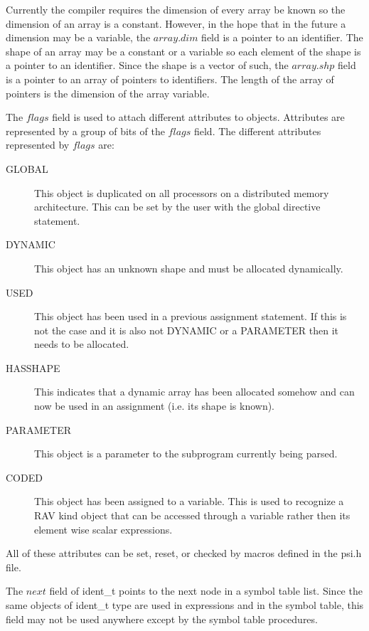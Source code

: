 Currently the compiler requires the dimension of every array be known
so the dimension of an array is a constant.  However, in the hope that in
the future a dimension may be a variable, the $array.dim$ field is a pointer
to an identifier.  The shape of an array may be a constant or a variable so
each element of the shape is a pointer to an identifier.  Since the shape
is a vector of such, the $array.shp$ field is a pointer to an array of pointers
to identifiers.  The length of the array of pointers is the dimension of the
array variable.

The $flags$ field is used to attach different attributes to objects.  
Attributes are represented by a group of bits of the $flags$ field. The 
different attributes represented by $flags$ are:

\begin{description}
\item[GLOBAL] This object is duplicated on all processors on a distributed
memory architecture.  This can be set by the user with the global directive
statement.

\item[DYNAMIC] This object has an unknown shape and must be allocated 
dynamically.

\item[USED] This object has been used in a previous assignment statement.  If 
this is not the case and it is also not DYNAMIC or a PARAMETER then it needs
to be allocated.

\item[HASSHAPE] This indicates that a dynamic array has been allocated somehow
and can now be used in an assignment (i.e. its shape is known).

\item[PARAMETER] This object is a parameter to the subprogram currently being
parsed.

\item[CODED] This object has been assigned to a variable.  This is used to
recognize a RAV kind object that can be accessed through a variable rather
then its element wise scalar expressions.
\end{description}
All of these attributes can be set, reset, or checked by macros defined in
the psi.h file.

The $next$ field of ident\_t points to the next node in a symbol table list.
Since the same objects of ident\_t type are used in expressions and in the 
symbol table, this field may not be used anywhere except by the symbol table
procedures.

